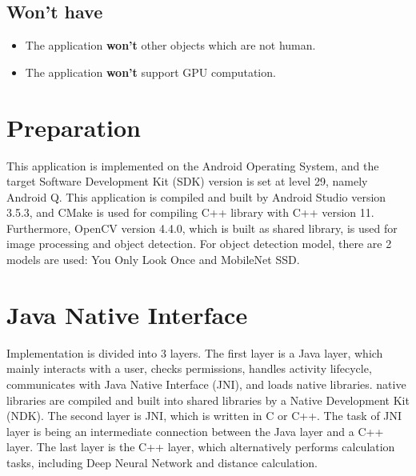         \subsection{Won't have}
            \begin{itemize}
                \item The application \textbf{won't} other objects which are not human.
                \item The application \textbf{won't} support GPU computation.
            \end{itemize}


    \section{Preparation}
        This application is implemented on the Android Operating System,
        and the target Software Development Kit (SDK) version is set at level 29, namely Android Q.
        This application is compiled and built by Android Studio version 3.5.3,
        and CMake is used for compiling C++ library with C++ version 11.
        Furthermore, OpenCV version 4.4.0, which is built as shared library, is used for image processing and object detection.
        For object detection model, there are 2 models are used: You Only Look Once and MobileNet SSD.

    \section{Java Native Interface}
        Implementation is divided into 3 layers.
            The first layer is a Java layer, which mainly interacts with a user,
            checks permissions, handles activity lifecycle, communicates with Java Native Interface (JNI), and loads native libraries.
                native libraries are compiled and built into shared libraries by a Native Development Kit (NDK).
            The second layer is JNI, which is written in C or C++.
                The task of JNI layer is being an intermediate connection between the Java layer and a C++ layer.
            The last layer is the C++ layer, which alternatively performs calculation tasks,
            including Deep Neural Network and distance calculation.


